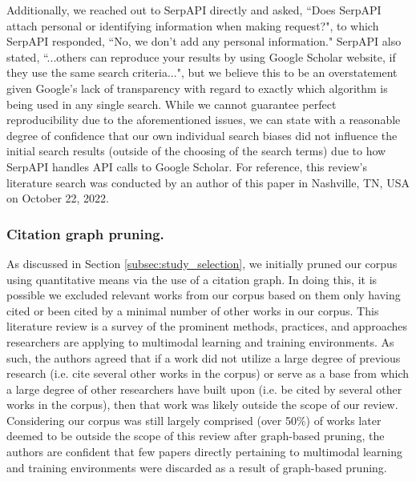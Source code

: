 \documentclass[manuscript,screen,review]{acmart}
\begin{document}
Additionally, we reached out to SerpAPI directly and asked, ``Does SerpAPI attach personal or identifying information when making request?", to which SerpAPI responded, ``No, we don't add any personal information." SerpAPI also stated, ``...others can reproduce your results by using Google Scholar website, if they use the same search criteria...", but we believe this to be an overstatement given Google's lack of transparency with regard to exactly which algorithm is being used in any single search. While we cannot guarantee perfect reproducibility due to the aforementioned issues, we can state with a reasonable degree of confidence that our own individual search biases did not influence the initial search results (outside of the choosing of the search terms) due to how SerpAPI handles API calls to Google Scholar. For reference, this review's literature search was conducted by an author of this paper in Nashville, TN, USA on October 22, 2022.

\subsubsection{Citation graph pruning.} 

As discussed in Section \ref{subsec:study_selection}, we initially pruned our corpus using quantitative means via the use of a citation graph. In doing this, it is possible we excluded relevant works from our corpus based on them only having cited or been cited by a minimal number of other works in our corpus. This literature review is a survey of the prominent methods, practices, and approaches researchers are applying to multimodal learning and training environments. As such, the authors agreed that if a work did not utilize a large degree of previous research (i.e. cite several other works in the corpus) or serve as a base from which a large degree of other researchers have built upon (i.e. be cited by several other works in the corpus), then that work was likely outside the scope of our review. Considering our corpus was still largely comprised (over 50\%) of works later deemed to be outside the scope of this review after graph-based pruning, the authors are confident that few papers directly pertaining to multimodal learning and training environments were discarded as a result of graph-based pruning.
\end{document}
